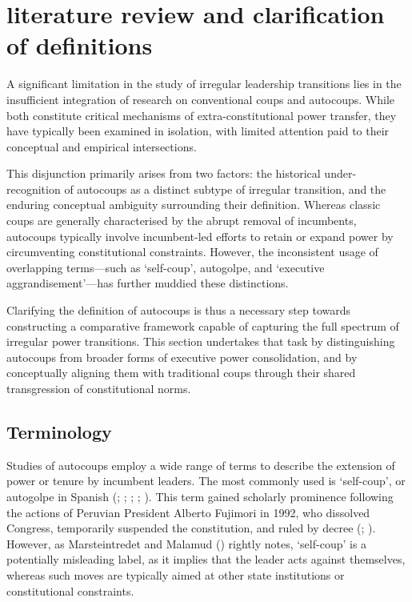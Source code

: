 \documentclass[
  12pt,
]{report}
\begin{document}
\section{literature review and clarification of
definitions}\label{literature-review-and-clarification-of-definitions}

A significant limitation in the study of irregular leadership
transitions lies in the insufficient integration of research on
conventional coups and autocoups. While both constitute critical
mechanisms of extra-constitutional power transfer, they have typically
been examined in isolation, with limited attention paid to their
conceptual and empirical intersections.

This disjunction primarily arises from two factors: the historical
under-recognition of autocoups as a distinct subtype of irregular
transition, and the enduring conceptual ambiguity surrounding their
definition. Whereas classic coups are generally characterised by the
abrupt removal of incumbents, autocoups typically involve incumbent-led
efforts to retain or expand power by circumventing constitutional
constraints. However, the inconsistent usage of overlapping terms---such
as `self-coup', autogolpe, and `executive aggrandisement'---has further
muddied these distinctions.

Clarifying the definition of autocoups is thus a necessary step towards
constructing a comparative framework capable of capturing the full
spectrum of irregular power transitions. This section undertakes that
task by distinguishing autocoups from broader forms of executive power
consolidation, and by conceptually aligning them with traditional coups
through their shared transgression of constitutional norms.

\subsection*{Terminology}\label{terminology}

Studies of autocoups employ a wide range of terms to describe the
extension of power or tenure by incumbent leaders. The most commonly
used is `self-coup', or autogolpe in Spanish
(;
;
; ; ). This term gained scholarly prominence following the actions of
Peruvian President Alberto Fujimori in 1992, who dissolved Congress,
temporarily suspended the constitution, and ruled by decree
(;
). However, as
Marsteintredet and Malamud ()
rightly notes, `self-coup' is a potentially misleading label, as it
implies that the leader acts against themselves, whereas such moves are
typically aimed at other state institutions or constitutional
constraints.
\end{document}
